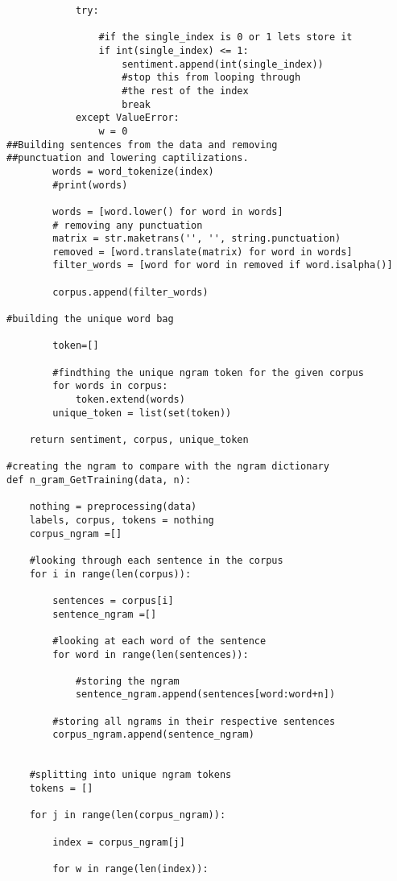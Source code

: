 \documentclass[12pt]{article}
\begin{document}
\begin{enumerate}
\begin{flushleft}
\begin{lstlisting}
            try:

                #if the single_index is 0 or 1 lets store it
                if int(single_index) <= 1:
                    sentiment.append(int(single_index))
                    #stop this from looping through 
                    #the rest of the index
                    break
            except ValueError:
                w = 0
##Building sentences from the data and removing 
##punctuation and lowering captilizations.
        words = word_tokenize(index)
        #print(words)

        words = [word.lower() for word in words]
        # removing any punctuation
        matrix = str.maketrans('', '', string.punctuation)
        removed = [word.translate(matrix) for word in words]
        filter_words = [word for word in removed if word.isalpha()]

        corpus.append(filter_words)
        
#building the unique word bag

        token=[]
        
        #findthing the unique ngram token for the given corpus
        for words in corpus:
            token.extend(words)
        unique_token = list(set(token))

    return sentiment, corpus, unique_token

#creating the ngram to compare with the ngram dictionary
def n_gram_GetTraining(data, n):

    nothing = preprocessing(data)
    labels, corpus, tokens = nothing
    corpus_ngram =[]

    #looking through each sentence in the corpus
    for i in range(len(corpus)):
    
        sentences = corpus[i]
        sentence_ngram =[]

        #looking at each word of the sentence
        for word in range(len(sentences)):
        
            #storing the ngram
            sentence_ngram.append(sentences[word:word+n])
            
        #storing all ngrams in their respective sentences
        corpus_ngram.append(sentence_ngram)


    #splitting into unique ngram tokens
    tokens = []
    
    for j in range(len(corpus_ngram)):
    
        index = corpus_ngram[j]
        
        for w in range(len(index)):
        

\end{lstlisting}
\end{flushleft}
\end{enumerate}
\end{document}
